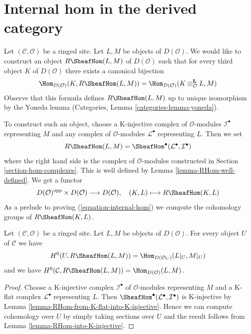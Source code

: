 \section{Internal hom in the derived category}
\label{section-internal-hom}

\noindent
Let $(\mathcal{C}, \mathcal{O})$ be a ringed site. Let $L, M$ be objects
of $D(\mathcal{O})$. We would like to construct an object
$R\SheafHom(L, M)$ of $D(\mathcal{O})$ such that for every third
object $K$ of $D(\mathcal{O})$ there exists a canonical bijection
\begin{equation}
\label{equation-internal-hom}
\Hom_{D(\mathcal{O})}(K, R\SheafHom(L, M))
=
\Hom_{D(\mathcal{O})}(K \otimes_\mathcal{O}^\mathbf{L} L, M)
\end{equation}
Observe that this formula defines $R\SheafHom(L, M)$ up to unique
isomorphism by the Yoneda lemma
(Categories, Lemma \ref{categories-lemma-yoneda}).

\medskip\noindent
To construct such an object, choose a K-injective complex of
$\mathcal{O}$-modules $\mathcal{I}^\bullet$ representing $M$ and any
complex of $\mathcal{O}$-modules $\mathcal{L}^\bullet$ representing $L$.
Then we set
$$
R\SheafHom(L, M) = \SheafHom^\bullet(\mathcal{L}^\bullet, \mathcal{I}^\bullet)
$$
where the right hand side is the complex of $\mathcal{O}$-modules
constructed in Section \ref{section-hom-complexes}.
This is well defined by Lemma \ref{lemma-RHom-well-defined}.
We get a functor
$$
D(\mathcal{O})^{opp} \times D(\mathcal{O}) \longrightarrow D(\mathcal{O}),
\quad
(K, L) \longmapsto R\SheafHom(K, L)
$$
As a prelude to proving (\ref{equation-internal-hom})
we compute the cohomology groups of $R\SheafHom(K, L)$.

\begin{lemma}
\label{lemma-section-RHom-over-U}
Let $(\mathcal{C}, \mathcal{O})$ be a ringed site. Let $L, M$ be objects
of $D(\mathcal{O})$. For every object $U$ of $\mathcal{C}$ we have
$$
H^0(U, R\SheafHom(L, M)) =
\Hom_{D(\mathcal{O}_U)}(L|_U, M|_U)
$$
and we have $H^0(\mathcal{C}, R\SheafHom(L, M)) =
\Hom_{D(\mathcal{O})}(L, M)$.
\end{lemma}

\begin{proof}
Choose a K-injective complex $\mathcal{I}^\bullet$ of
$\mathcal{O}$-modules representing $M$ and a K-flat complex
$\mathcal{L}^\bullet$ representing $L$. Then
$\SheafHom^\bullet(\mathcal{L}^\bullet, \mathcal{I}^\bullet)$
is K-injective by Lemma \ref{lemma-RHom-from-K-flat-into-K-injective}.
Hence we can compute cohomology over $U$ by simply taking sections over $U$
and the result follows from Lemma \ref{lemma-RHom-into-K-injective}.
\end{proof}

